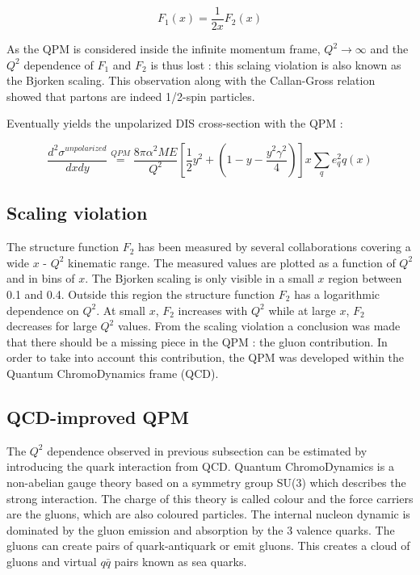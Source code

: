 \begin{equation}
  F_1(x)=\frac{1}{2x}F_2(x)
\end{equation}

As the QPM is considered inside the infinite momentum frame, $Q^2 \rightarrow \infty$ and the $Q^2$ dependence of
$F_1$ and $F_2$ is thus lost : this sclaing violation is also known as the Bjorken scaling. This observation along
with the Callan-Gross relation showed that partons are indeed 1/2-spin particles.

Eventually yields the unpolarized DIS cross-section with the QPM :

\begin{equation}
  \frac{d^2\sigma^{unpolarized}}{dxdy} \stackrel{QPM}{=} \frac{8\pi\alpha^2ME}{Q^2}[\frac{1}{2}y^2+(1-y-\frac{y^2\gamma^2}{4})]x\sum\limits_{q}e^2_qq(x)
\end{equation}

\subsection*{Scaling violation}

The structure function $F_2$ has been measured by several collaborations covering a wide $x$ - $Q^2$ kinematic range.
The measured values are plotted as a function of $Q^2$ and in bins of $x$. The Bjorken scaling is only visible in a
small $x$ region between 0.1 and 0.4. Outside this region the structure function $F_2$ has a logarithmic dependence on
$Q^2$. At small $x$, $F_2$ increases with $Q^2$ while at large $x$, $F_2$ decreases for large $Q^2$ values. From the scaling
violation a conclusion was made that there should be a missing piece in the QPM : the gluon contribution. In order to take
into account this contribution, the QPM was developed within the Quantum ChromoDynamics frame (QCD).


\subsection*{QCD-improved QPM}

The $Q^2$ dependence observed in previous subsection can be estimated by introducing the quark interaction from QCD.
Quantum ChromoDynamics is a non-abelian gauge theory based on a symmetry group SU(3) which describes the strong interaction.
The charge of this theory is called colour and the force carriers are the gluons, which are also coloured particles. The
internal nucleon dynamic is dominated by the gluon emission and absorption by the 3 valence quarks. The gluons can create
pairs of quark-antiquark or emit gluons. This creates a cloud of gluons and virtual $q\bar{q}$ pairs known as sea quarks.

